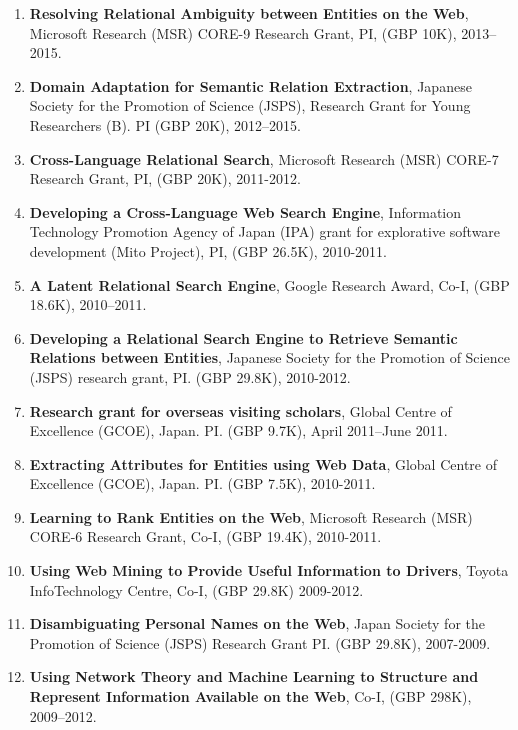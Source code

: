 \documentclass[a4paper,11pt]{article}
\begin{document}
\begin{enumerate}
\item \textbf{Resolving Relational Ambiguity between Entities on the Web}, Microsoft Research (MSR) CORE-9 Research Grant, PI, (GBP 10K), 2013–2015.

\item \textbf{Domain Adaptation for Semantic Relation Extraction}, Japanese Society for the Promotion of Science (JSPS), Research Grant for Young Researchers (B). PI (GBP 20K), 2012–2015.

\item \textbf{Cross-Language Relational Search}, Microsoft Research (MSR) CORE-7 Research Grant, PI, (GBP 20K), 2011-2012.

\item \textbf{Developing a Cross-Language Web Search Engine}, Information Technology Promotion Agency of Japan (IPA) grant for explorative software development (Mito Project), PI, (GBP 26.5K), 2010-2011.

\item \textbf{A Latent Relational Search Engine}, Google Research Award, Co-I, (GBP 18.6K), 2010–2011.

\item \textbf{Developing a Relational Search Engine to Retrieve Semantic Relations between Entities}, Japanese Society for the Promotion of Science (JSPS) research grant, PI. (GBP 29.8K), 2010-2012.

\item \textbf{Research grant for overseas visiting scholars}, Global Centre of Excellence (GCOE), Japan. PI. (GBP 9.7K), April 2011–June 2011.

\item \textbf{Extracting Attributes for Entities using Web Data}, Global Centre of Excellence (GCOE), Japan. PI. (GBP 7.5K), 2010-2011.

\item \textbf{Learning to Rank Entities on the Web}, Microsoft Research (MSR) CORE-6 Research Grant, Co-I, (GBP 19.4K), 2010-2011.

\item \textbf{Using Web Mining to Provide Useful Information to Drivers}, Toyota InfoTechnology Centre, Co-I, (GBP 29.8K) 2009-2012.

\item \textbf{Disambiguating Personal Names on the Web}, Japan Society for the Promotion of Science (JSPS) Research Grant PI. (GBP 29.8K), 2007-2009.

\item \textbf{Using Network Theory and Machine Learning to Structure and Represent Information Available on the Web}, Co-I, (GBP 298K), 2009–2012.
\end{enumerate}
\end{document}
